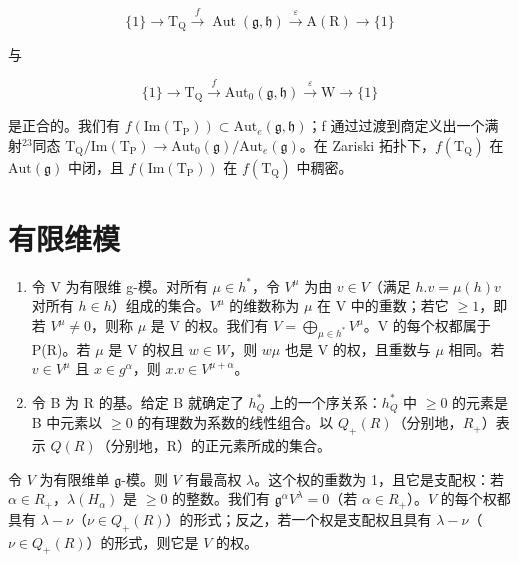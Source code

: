 \[
\{1 \} \longrightarrow \mathrm {T_ {Q}} \stackrel {{f}} {{\longrightarrow}} \operatorname{Aut} (\mathfrak {g}, \mathfrak {h}) \stackrel {{\varepsilon}} {{\longrightarrow}} \mathrm{A(R)} \longrightarrow \{1 \}
\]

与

\[
\{1 \} \longrightarrow \mathrm{T} _ {\mathrm{Q}} \stackrel {f} {\longrightarrow} \mathrm{Aut} _ {0} (\mathfrak {g}, \mathfrak {h}) \stackrel {\varepsilon} {\longrightarrow} \mathrm{W} \longrightarrow \{1 \}
\]

是正合的。我们有 \(f(\mathrm{Im}(\mathrm{T}_{\mathrm{P}})) \subset \mathrm{Aut}_{e}(\mathfrak{g}, \mathfrak{h})\)；f 通过过渡到商定义出一个满射\(^{23}\)同态 \(\mathrm{T}_{\mathrm{Q}}/\mathrm{Im}(\mathrm{T}_{\mathrm{P}}) \to \mathrm{Aut}_{0}(\mathfrak{g})/\mathrm{Aut}_{e}(\mathfrak{g})\)。在 Zariski 拓扑下，\(f(\mathrm{T}_{\mathrm{Q}})\) 在 \(\mathrm{Aut}(\mathfrak{g})\) 中闭，且 \(f(\mathrm{Im}(\mathrm{T}_{\mathrm{P}}))\) 在 \(f(\mathrm{T}_{\mathrm{Q}})\) 中稠密。

\section*{有限维模}

\begin{enumerate}
\def\labelenumi{\arabic{enumi})}
\setcounter{enumi}{18}
\item
  令 V 为有限维 g-模。对所有 \(\mu\in h^{*}\)，令 \(V^{\mu}\) 为由 \(v\in V\)（满足 \(h.v=\mu(h)v\) 对所有 \(h\in h\)）组成的集合。\(V^{\mu}\) 的维数称为 \(\mu\) 在 V 中的重数；若它 \(\geq1\)，即若 \(V^{\mu}\neq0\)，则称 \(\mu\) 是 V 的权。我们有 \(V=\bigoplus_{\mu\in h^{*}}V^{\mu}\)。V 的每个权都属于 P(R)。若 \(\mu\) 是 V 的权且 \(w\in W\)，则 \(w\mu\) 也是 V 的权，且重数与 \(\mu\) 相同。若 \(v\in V^{\mu}\) 且 \(x\in g^{\alpha}\)，则 \(x.v\in V^{\mu+\alpha}\)。
\item
  令 B 为 R 的基。给定 B 就确定了 \(h_{Q}^{*}\) 上的一个序关系：\(h_{Q}^{*}\) 中 \(\geq 0\) 的元素是 B 中元素以 \(\geq 0\) 的有理数为系数的线性组合。以 \(Q_{+}(R)\)（分别地，\(R_{+}\)）表示 \(Q(R)\)（分别地，R）的正元素所成的集合。
\end{enumerate}

令 \(V\) 为有限维单 \(\mathfrak{g}\)-模。则 \(V\) 有最高权 \(\lambda\)。这个权的重数为 1，且它是支配权：若 \(\alpha \in R_{+}\)，\(\lambda(H_{\alpha})\) 是 \(\geq 0\) 的整数。我们有 \(\mathfrak{g}^{\alpha}V^{\lambda} = 0\)（若 \(\alpha \in R_{+}\)）。\(V\) 的每个权都具有 \(\lambda - \nu\)（\(\nu \in Q_{+}(R)\)）的形式；反之，若一个权是支配权且具有 \(\lambda - \nu\)（\(\nu \in Q_{+}(R)\)）的形式，则它是 \(V\) 的权。

